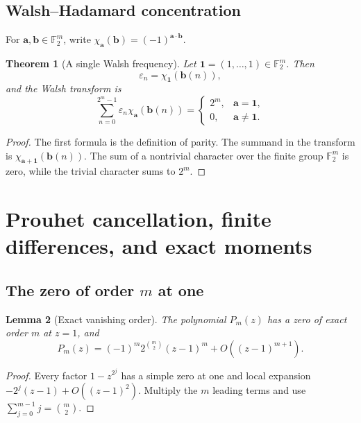 \documentclass[11pt,oneside]{article}
\newtheorem{theorem}{Theorem}[section]
\newtheorem{lemma}[theorem]{Lemma}
\theoremstyle{definition}
\theoremstyle{remark}
\newcommand{\F}{\mathbb F}
\newcommand{\eps}{\varepsilon}
\newcommand{\1}{\mathbf 1}
\begin{document}
\subsection{Walsh--Hadamard concentration}

For \(\bm a,\bm b\in\F_2^m\), write
\(\chi_{\bm a}(\bm b)=(-1)^{\bm a\cdot\bm b}\).

\begin{theorem}[A single Walsh frequency]
\label{p3:thm:walsh}
Let \(\bm1=(1,\ldots,1)\in\F_2^m\).  Then
\begin{equation}
 \eps_n=\chi_{\bm1}(\bm b(n)),
 \label{p3:eq:walsh-character}
\end{equation}
and the Walsh transform is
\begin{equation}
 \sum_{n=0}^{2^m-1}\eps_n\chi_{\bm a}(\bm b(n))
 =\begin{cases}
   2^m,&\bm a=\bm1,\\
   0,&\bm a\ne\bm1.
  \end{cases}
 \label{p3:eq:walsh-transform}
\end{equation}
\end{theorem}

\begin{proof}
The first formula is the definition of parity.  The summand in the transform is
\(\chi_{\bm a+\bm1}(\bm b(n))\).  The sum of a nontrivial character over the finite group
\(\F_2^m\) is zero, while the trivial character sums to \(2^m\).
\end{proof}

\section{Prouhet cancellation, finite differences, and exact moments}
\label{p3:sec:prouhet}

\subsection{The zero of order \(m\) at one}

\begin{lemma}[Exact vanishing order]
\label{p3:lem:order-m}
The polynomial \(P_m(z)\) has a zero of exact order \(m\) at \(z=1\), and
\begin{equation}
 P_m(z)=(-1)^m2^{\binom m2}(z-1)^m+O((z-1)^{m+1}).
 \label{p3:eq:Pm-local}
\end{equation}
\end{lemma}

\begin{proof}
Every factor \(1-z^{2^j}\) has a simple zero at one and local expansion
\(-2^j(z-1)+O((z-1)^2)\).  Multiply the \(m\) leading terms and use
\(\sum_{j=0}^{m-1}j=\binom m2\).
\end{proof}
\end{document}
